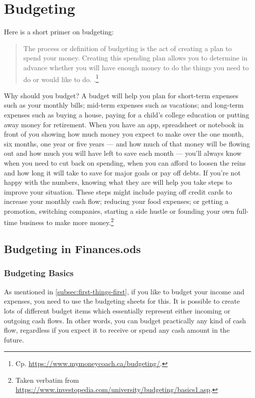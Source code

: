\section{Budgeting}
\label{section:Budgeting}

Here is a short primer on budgeting:
\begin{quote}\small
	The process or definition of budgeting is the act of creating a plan to spend your money.
	Creating this spending plan allows you to determine in advance whether you will have enough money to do the things you need to do or would like to do. .\footnote{Cp. \url{https://www.mymoneycoach.ca/budgeting/}.}
\end{quote}

Why should you budget? A budget will help you plan for short-term expenses such as your monthly bills; mid-term expenses such as vacations; and long-term expenses such as buying a house, paying for a child’s college education or putting away money for retirement.
When you have an app, spreadsheet or notebook in front of you showing how much money you expect to make over the one month, six months, one year or five years --- and how much of that money will be flowing out and how much you will have left to save each month --- you’ll always know when you need to cut back on spending, when you can afford to loosen the reins and how long it will take to save for major goals or pay off debts.
If you’re not happy with the numbers, knowing what they are will help you take steps to improve your situation.
These steps might include paying off credit cards to increase your monthly cash flow; reducing your food expenses; or getting a promotion, switching companies, starting a side hustle or founding your own full-time business to make more money.\footnote{Taken verbatim from \url{https://www.investopedia.com/university/budgeting/basics1.asp}.}

\subsection{Budgeting in Finances.ods}
\label{subsec:budgeting-in-finances.ods}

\subsubsection{Budgeting Basics}
\label{subsubsec:budgeting-basics}

As mentioned in \autoref{subsec:first-things-first}, if you like to budget your income and expenses, you need to use the budgeting sheets for this.
It is possible to create lots of different budget items which essentially represent either incoming or outgoing cash flows.
In other words, you can budget practically any kind of cash flow, regardless if you expect it to receive or spend any cash amount in the future.

